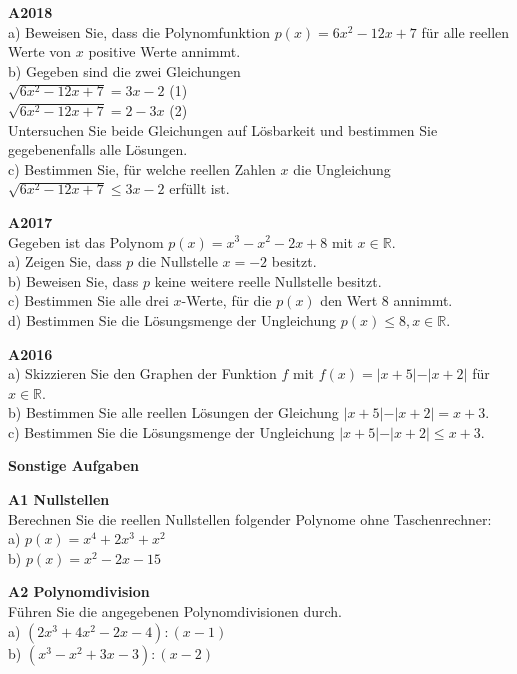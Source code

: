 \documentclass[landscape,twocolumn,a4paper]{article}
\begin{document}
\textbf{A2018} \\
a) Beweisen Sie, dass die Polynomfunktion $p(x) = 6x^2-12x+7$ für alle reellen Werte von $x$ 
positive Werte annimmt. \\
b) Gegeben sind die zwei Gleichungen \\
\quad $\sqrt{6x^2-12x+7} = 3x-2$ \quad (1) \\
\quad $\sqrt{6x^2-12x+7} = 2-3x$ \quad (2) \\
Untersuchen Sie beide Gleichungen auf Lösbarkeit und bestimmen Sie gegebenenfalls alle Lösungen. \\
c) Bestimmen Sie, für welche reellen Zahlen $x$ die Ungleichung \\
 $\sqrt{6x^2-12x+7} \le 3x-2$ erfüllt ist.
\bigskip

\textbf{A2017} \\
Gegeben ist das Polynom $p(x) = x^3-x^2 -2x+8$ mit $x \in \mathbb{R}$. \\
a) Zeigen Sie, dass $p$ die Nullstelle $x = -2$ besitzt. \\
b) Beweisen Sie, dass $p$ keine weitere reelle Nullstelle besitzt. \\
c) Bestimmen Sie alle drei $x$-Werte, für die $p(x)$ den Wert 8 annimmt. \\
d) Bestimmen Sie die Lösungsmenge der Ungleichung $p(x) \le 8, x \in \mathbb{R}$.
\bigskip

\textbf{A2016} \\
a) Skizzieren Sie den Graphen der Funktion $f$ mit 
$f(x) = \vert x + 5 \vert - \vert x+2 \vert$ für $x \in \mathbb{R}$. \\
b) Bestimmen Sie alle reellen Lösungen der Gleichung 
 $\vert x + 5 \vert - \vert x+2 \vert = x + 3$. \\
c) Bestimmen Sie die Lösungsmenge der Ungleichung 
 $\vert x + 5 \vert - \vert x+2 \vert \le x + 3$. 
 \bigskip
 
 \newpage
 \textbf{Sonstige Aufgaben}
 \bigskip
 
 \textbf{A1 Nullstellen} \\
 Berechnen Sie die reellen Nullstellen folgender Polynome ohne Taschenrechner: \\
 a) $p(x) = x^4+2x^3+x^2$ \\
 b) $p(x) = x^2 -2x -15$ 
 \bigskip
 
 \textbf{A2 Polynomdivision} \\
Führen Sie die angegebenen Polynomdivisionen durch. \\
 a) $(2x^3+4x^2-2x-4) : (x-1)$ \\
 b) $(x^3-x^2+3x-3) : (x-2)$
 \bigskip
 
\end{document}
